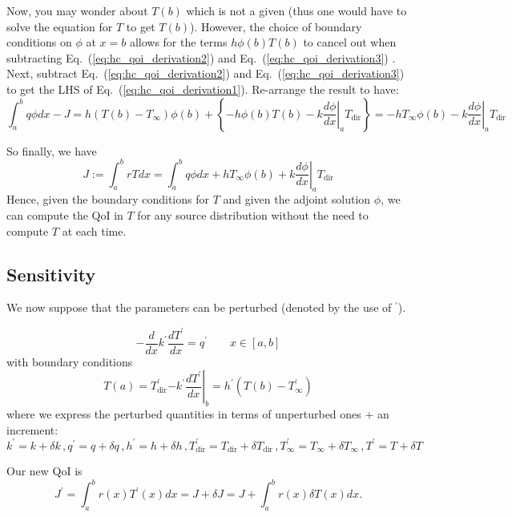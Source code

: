 \documentclass[11pt]{article}
\newcommand{\eqt}[1]{Eq.~(\ref{#1})}                     %
\newcommand{\be}{\begin{equation}}
\newcommand{\ee}{\end{equation}}
\begin{document}
Now, you may wonder about $T(b)$ which is not a given (thus one would have to solve the equation for $T$ to get $T(b)$). However, the choice of boundary conditions on $\phi$ at $x=b$ allows for the terms $h\phi(b)T(b)$ to cancel out when 
subtracting \eqt{eq:hc_qoi_derivation2} and \eqt{eq:hc_qoi_derivation3} . 
Next, subtract \eqt{eq:hc_qoi_derivation2} and \eqt{eq:hc_qoi_derivation3} to get the LHS of \eqt{eq:hc_qoi_derivation1}. Re-arrange the result to have:
\be
\int_a^b q \phi dx - J
=
h(T(b)-T_{\infty})\phi(b) 
+
\left\{-h\phi(b)T(b) - \left.k\frac{d\phi}{dx}\right|_a T_{\text{dir}} \right\}
= - h T_{\infty} \phi(b) - \left.k\frac{d\phi}{dx}\right|_a T_{\text{dir}}
\ee

So finally, we have
\be
\label{eq:ex_heat_conduction_qoi_final_expr}
\boxed{
J := \int_a^b rT dx = \int_a^b q \phi dx + h T_{\infty} \phi(b) + \left.k\frac{d\phi}{dx}\right|_a T_{\text{dir}}
}
\ee
Hence, given the boundary conditions for $T$ and given the adjoint solution $\phi$, we can compute the QoI in $T$ for any source distribution without the need to compute $T$ at each time.

\subsection{Sensitivity}

We now suppose that the parameters can be perturbed (denoted by the use of $^\prime$).


\be
\label{eq:ex_heat_conduction_pert}
-\frac{d}{dx}k^\prime\frac{dT^\prime}{dx}=q^\prime \qquad x\in [a,b]
\ee
with boundary conditions
\begin{subequations}
\label{eq:ex_heat_conduction_bc}
\be
T(a) = T^\prime_{\text{dir}} 
\ee
\be
-k^\prime \left.\frac{dT^\prime}{dx}\right|_b = h^\prime(T(b)-T^\prime_{\infty})
\ee
\end{subequations}
where we express the perturbed quantities in terms of unperturbed ones + an increment:
\[ 
k^\prime = k + \delta k\,, 
q^\prime = q + \delta q\,, 
h^\prime = h + \delta h\,, 
T^\prime_{\text{dir}}  = T_{\text{dir}} + \delta T_{\text{dir}} \,, 
T^\prime_{\infty}      = T_{\infty}     + \delta T_{\infty}     \,, 
T^\prime = T + \delta T
\]
 
Our new QoI is 
\be
\label{eq:ex_heat_conduction_qoi_pert}
J^\prime = \int_a^b r(x) T^\prime(x) dx = J + \delta J = J + \int_a^b r(x) \delta T(x) dx.
\ee
\end{document}
